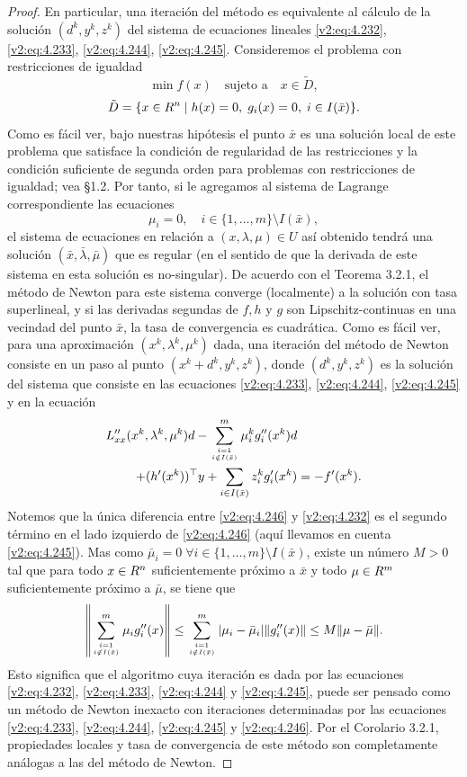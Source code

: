 \begin{proof}
    En particular, una iteración del método es equivalente al cálculo de la solución $(d^k, y^k, z^k)$ del sistema de ecuaciones lineales \eqref{v2:eq:4.232}, \eqref{v2:eq:4.233}, \eqref{v2:eq:4.244}, \eqref{v2:eq:4.245}.
    Consideremos el problema con restricciones de igualdad
    \[
        \min f(x) \quad \text{sujeto a} \quad x \in \tilde{D},
    \]
    \[
        \tilde{D} = \{x \in R^n \mid h(x) = 0, \; g_i(x) = 0, \; i \in I(\bar{x})\}.
    \]
    Como es fácil ver, bajo nuestras hipótesis el punto $\bar{x}$ es una solución local de este problema que satisface la condición de regularidad de las restricciones y la condición suficiente de segunda orden para problemas con restricciones de igualdad; vea \S 1.2. Por tanto, si le agregamos al sistema de Lagrange correspondiente las ecuaciones
    \[
        \mu_i = 0, \quad i \in \{1, \dots, m\} \setminus I(\bar{x}),
    \]
    el sistema de ecuaciones en relación a $(x, \lambda, \mu) \in U$ así obtenido tendrá una solución $(\bar{x}, \bar{\lambda}, \bar{\mu})$ que es regular (en el sentido de que la derivada de este sistema en esta solución es no-singular). De acuerdo con el Teorema 3.2.1, el método de Newton para este sistema converge (localmente) a la solución con tasa superlineal, y si las derivadas segundas de $f, h$ y $g$ son Lipschitz-continuas en una vecindad del punto $\bar{x}$, la tasa de convergencia es cuadrática.
    Como es fácil ver, para una aproximación $(x^k, \lambda^k, \mu^k)$ dada, una iteración del método de Newton consiste en un paso al punto $(x^k + d^k, y^k, z^k)$, donde $(d^k, y^k, z^k)$ es la solución del sistema que consiste en las ecuaciones \eqref{v2:eq:4.233}, \eqref{v2:eq:4.244}, \eqref{v2:eq:4.245} y en la ecuación
    \begin{align}
        L''_{xx}(x^k, \lambda^k, \mu^k)d - \sum_{i=1 \atop i \notin I(\bar{x})}^m \mu_i^k g''_i(x^k)d & \nonumber \\
        + (h'(x^k))^\top y + \sum_{i \in I(\bar{x})} z_i^k g'_i(x^k) &= -f'(x^k).
        \label{v2:eq:4.246}
    \end{align}
    Notemos que la única diferencia entre \eqref{v2:eq:4.246} y \eqref{v2:eq:4.232} es el segundo término en el lado izquierdo de \eqref{v2:eq:4.246} (aquí llevamos en cuenta \eqref{v2:eq:4.245}). Mas como $\bar{\mu}_i = 0 \; \forall i \in \{1, \dots, m\} \setminus I(\bar{x})$, existe un número $M > 0$ tal que para todo $x \in R^n$ suficientemente próximo a $\bar{x}$ y todo $\mu \in R^m$ suficientemente próximo a $\bar{\mu}$, se tiene que
    \[
        \left\| \sum_{i=1 \atop i \notin I(\bar{x})}^m \mu_i g''_i(x) \right\| \le \sum_{i=1 \atop i \notin I(\bar{x})}^m |\mu_i - \bar{\mu}_i| \|g''_i(x)\| \le M\|\mu - \bar{\mu}\|.
    \]
    Esto significa que el algoritmo cuya iteración es dada por las ecuaciones \eqref{v2:eq:4.232}, \eqref{v2:eq:4.233}, \eqref{v2:eq:4.244} y \eqref{v2:eq:4.245}, puede ser pensado como un método de Newton inexacto con iteraciones determinadas por las ecuaciones \eqref{v2:eq:4.233}, \eqref{v2:eq:4.244}, \eqref{v2:eq:4.245} y \eqref{v2:eq:4.246}. Por el Corolario 3.2.1, propiedades locales y tasa de convergencia de este método son completamente análogas a las del método de Newton.
\end{proof}

